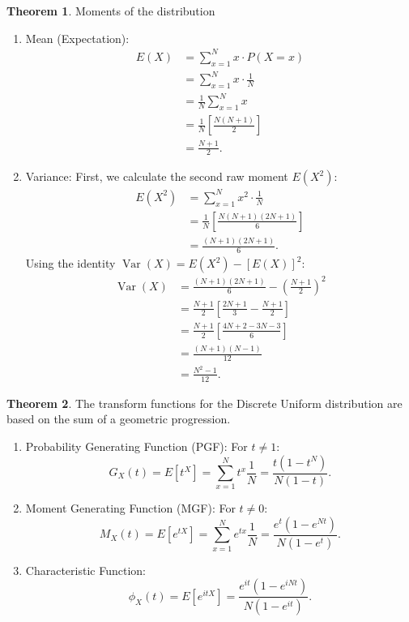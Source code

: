 \documentclass[12pt,a4paper]{report}
\theoremstyle{definition}
\newtheorem{thm}{Theorem}[section]
\theoremstyle{plain}
\theoremstyle{definition}
\begin{document}
\begin{thm} Moments of the distribution
\begin{enumerate} 
\item Mean (Expectation): \begin{align*} E(X) &= \sum_{x=1}^N x \cdot P(X=x)\\ 
&= \sum_{x=1}^N x \cdot \frac{1}{N} \\ 
&= \frac{1}{N} \sum_{x=1}^N x\\
& = \frac{1}{N} \left[ \frac{N(N+1)}{2} \right]\\ 
&= \frac{N+1}{2}. 
\end{align*}

\item Variance:
First, we calculate the second raw moment $E(X^2)$:
\begin{align*}
E(X^2) &= \sum_{x=1}^N x^2 \cdot \frac{1}{N}\\
       & = \frac{1}{N} \left[ \frac{N(N+1)(2N+1)}{6} \right] \\
       &= \frac{(N+1)(2N+1)}{6}.
\end{align*}
Using the identity $\operatorname{Var}(X) = E(X^2) - [E(X)]^2$:
\begin{align*}
\operatorname{Var}(X) &= \frac{(N+1)(2N+1)}{6} - \left( \frac{N+1}{2} \right)^2 \\
              &= \frac{N+1}{2} \left[ \frac{2N+1}{3} - \frac{N+1}{2} \right] \\
              &= \frac{N+1}{2} \left[ \frac{4N+2 - 3N - 3}{6} \right] \\
              &= \frac{(N+1)(N-1)}{12}\\
              & = \frac{N^2-1}{12}.
\end{align*}
\end{enumerate}
\end{thm}



\begin{thm} The transform functions for the Discrete Uniform distribution are based on the sum of a geometric progression.\begin{enumerate}
\item Probability Generating Function (PGF): For $t \neq 1$:\[ G_X(t) = E[t^X] = \sum_{x=1}^N t^x \frac{1}{N} = \frac{t(1-t^N)}{N(1-t)}. \]
\item Moment Generating Function (MGF):
For $t \neq 0$:
\[ M_X(t) = E[e^{tX}] = \sum_{x=1}^N e^{tx} \frac{1}{N} = \frac{e^t(1-e^{Nt})}{N(1-e^t)}. \]

\item Characteristic Function:
\[ \phi_X(t) = E[e^{itX}] = \frac{e^{it}(1-e^{iNt})}{N(1-e^{it})}. \]
\end{enumerate}
\end{thm}
\end{document}
